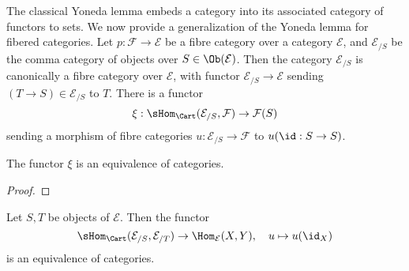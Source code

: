The classical Yoneda lemma embeds a category into its associated category
of functors to sets. We now provide a generalization of the Yoneda lemma for fibered categories. Let $p:\mathcal{F}\to\mathcal{E}$ be a fibre category over a category $\mathcal{E}$, and $\mathcal{E}_{/S}$ be the comma category of objects over $S\in\Ob(\mathcal{E})$. Then the category $\mathcal{E}_{/S}$ is canonically a fibre category over $\mathcal{E}$, with functor $\mathcal{E}_{/S}\to\mathcal{E}$ sending $(T\to S)\in\mathcal{E}_{/S}$ to $T$. There is a functor
\[\xi:\sHom_{\Cart}(\mathcal{E}_{/S},\mathcal{F})\to\mathcal{F}(S)\]
sending a morphism of fibre categories $u:\mathcal{E}_{/S}\to\mathcal{F}$ to $u(\id:S\to S)$.

\begin{proposition}
The functor $\xi$ is an equivalence of categories.
\end{proposition}
\begin{proof}

\end{proof}

\begin{corollary}
Let $S,T$ be objects of $\mathcal{E}$. Then the functor
\[\sHom_{\Cart}(\mathcal{E}_{/S},\mathcal{E}_{/T})\to\Hom_{\mathcal{E}}(X,Y),\quad u\mapsto u(\id_X)\]
is an equivalence of categories.
\end{corollary}

